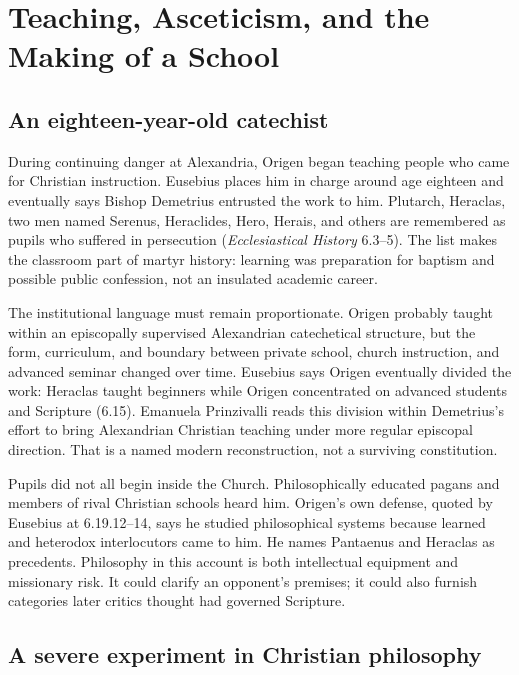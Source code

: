 \section{Teaching, Asceticism, and the Making of a School}
\label{sec:origen-school}

\subsection{An eighteen-year-old catechist}

During continuing danger at Alexandria, Origen began teaching people who came
for Christian instruction. Eusebius places him in charge around age eighteen
and eventually says Bishop Demetrius entrusted the work to him. Plutarch,
Heraclas, two men named Serenus, Heraclides, Hero, Herais, and others are
remembered as pupils who suffered in persecution (\emph{Ecclesiastical
History} 6.3--5). The list makes the classroom part of martyr history: learning
was preparation for baptism and possible public confession, not an insulated
academic career.

The institutional language must remain proportionate. Origen probably taught
within an episcopally supervised Alexandrian catechetical structure, but the
form, curriculum, and boundary between private school, church instruction, and
advanced seminar changed over time. Eusebius says Origen eventually divided
the work: Heraclas taught beginners while Origen concentrated on advanced
students and Scripture (6.15). Emanuela Prinzivalli reads this division within
Demetrius's effort to bring Alexandrian Christian teaching under more regular
episcopal direction. That is a named modern reconstruction, not a surviving
constitution.

Pupils did not all begin inside the Church. Philosophically educated pagans and
members of rival Christian schools heard him. Origen's own defense, quoted by
Eusebius at 6.19.12--14, says he studied philosophical systems because learned
and heterodox interlocutors came to him. He names Pantaenus and Heraclas as
precedents. Philosophy in this account is both intellectual equipment and
missionary risk. It could clarify an opponent's premises; it could also furnish
categories later critics thought had governed Scripture.

\subsection{A severe experiment in Christian philosophy}

